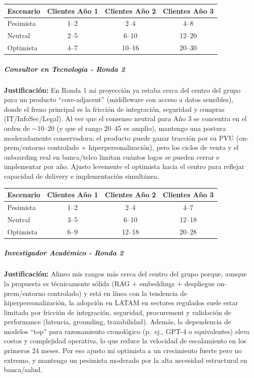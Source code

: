 \begin{center}
\footnotesize
\begin{tabular}{|l|c|c|c|}
\hline
\textbf{Escenario} & \textbf{Clientes Año 1} & \textbf{Clientes Año 2} & \textbf{Clientes Año 3} \\
\hline
Pesimista & 1--2 & 2--4 & 4--8 \\
\hline
Neutral & 2--5 & 6--10 & 12--20 \\
\hline
Optimista & 4--7 & 10--16 & 20--30 \\
\hline
\end{tabular}
\end{center}

\subparagraph{Consultor en Tecnología - Ronda 2}

\textbf{Justificación:} En Ronda 1 mi proyección ya estaba cerca del centro del grupo para un producto ``core-adjacent'' (middleware con acceso a datos sensibles), donde el freno principal es la fricción de integración, seguridad y compras (IT/InfoSec/Legal). Al ver que el consenso neutral para Año 3 se concentra en el orden de $\sim$10--20 (y que el rango 20--45 es amplio), mantengo una postura moderadamente conservadora: el producto puede ganar tracción por su PVU (on-prem/entorno controlado + hiperpersonalización), pero los ciclos de venta y el onboarding real en banca/telco limitan cuántos logos se pueden cerrar e implementar por año. Ajusto levemente el optimista hacia el centro para reflejar capacidad de delivery e implementación simultánea.

\begin{center}
\footnotesize
\begin{tabular}{|l|c|c|c|}
\hline
\textbf{Escenario} & \textbf{Clientes Año 1} & \textbf{Clientes Año 2} & \textbf{Clientes Año 3} \\
\hline
Pesimista & 1--2 & 2--4 & 4--7 \\
\hline
Neutral & 3--5 & 6--10 & 12--18 \\
\hline
Optimista & 6--9 & 12--18 & 20--28 \\
\hline
\end{tabular}
\end{center}

\subparagraph{Investigador Académico - Ronda 2}

\textbf{Justificación:} Alineo mis rangos más cerca del centro del grupo porque, aunque la propuesta es técnicamente sólida (RAG + embeddings + despliegue on-prem/entorno controlado) y está en línea con la tendencia de hiperpersonalización, la adopción en LATAM en sectores regulados suele estar limitada por fricción de integración, seguridad, procurement y validación de performance (latencia, grounding, trazabilidad). Además, la dependencia de modelos ``top'' para razonamiento cronológico (p.\ ej., GPT-4 o equivalentes) eleva costos y complejidad operativa, lo que reduce la velocidad de escalamiento en los primeros 24 meses. Por eso ajusto mi optimista a un crecimiento fuerte pero no extremo, y mantengo un pesimista moderado por la alta necesidad estructural en banca/salud.

